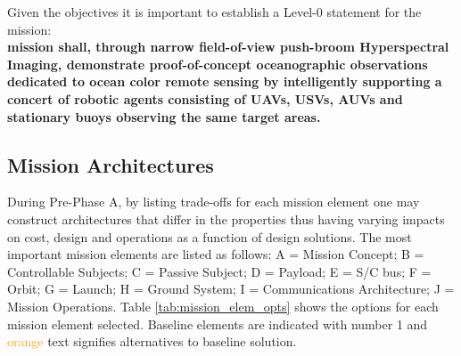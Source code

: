 Given the objectives it is important to establish a Level-0 statement for the mission:\\

\textbf{\hypso mission shall, through narrow field-of-view push-broom Hyperspectral Imaging, demonstrate proof-of-concept oceanographic observations dedicated to ocean color remote sensing by intelligently supporting a concert of robotic agents consisting of UAVs, USVs, AUVs and stationary buoys observing the same target areas.}\\

\subsection{Mission Architectures}
During Pre-Phase A, by listing trade-offs for each mission element one may construct architectures that differ in the properties thus having varying impacts on cost, design and operations as a function of design solutions. The most important mission elements are listed as follows: A = Mission Concept; B = Controllable Subjects; C = Passive Subject; D = Payload; E = S/C bus; F = Orbit; G = Launch; H = Ground System; I = Communications Architecture; J = Mission Operations. Table \ref{tab:mission_elem_opts} shows the options for each mission element selected. Baseline elements are indicated with number 1 and \textcolor{orange}{orange} text signifies alternatives to baseline solution.
